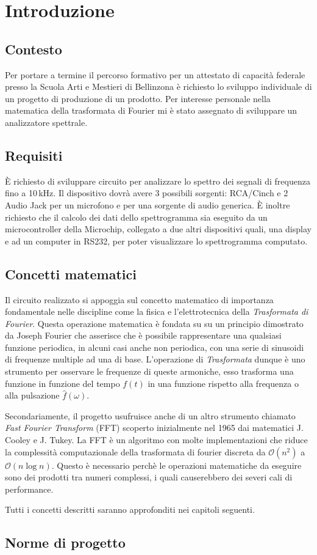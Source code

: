 \chapter{Introduzione}

\section{Contesto}
Per portare a termine il percorso formativo per un attestato di capacit\`a
federale presso la Scuola Arti e Mestieri di Bellinzona \`e richiesto lo
sviluppo individuale di un progetto di produzione di un prodotto.
Per interesse personale nella matematica della trasformata di Fourier mi \`e
stato assegnato di sviluppare un analizzatore spettrale.

\section{Requisiti}
\`E richiesto di sviluppare circuito per analizzare lo spettro dei segnali di
frequenza fino a 10\,kHz. Il dispositivo dovr\`a avere 3 possibili sorgenti:
RCA/Cinch e 2 Audio Jack per un microfono e per una sorgente di audio
generica. \`E inoltre richiesto che il calcolo dei dati dello spettrogramma
sia eseguito da un microcontroller della Microchip, collegato a due
altri dispositivi quali, una display e ad un computer in RS232, per poter
visualizzare lo spettrogramma computato.

\section{Concetti matematici}
Il circuito realizzato si appoggia sul concetto matematico di importanza
fondamentale nelle discipline come la fisica e l'elettrotecnica della
\emph{Trasformata di Fourier}. Questa operazione matematica \`e fondata su su
un principio dimostrato da Joseph Fourier che asserisce che \`e possibile
rappresentare una qualsiasi funzione periodica, in alcuni casi anche non
periodica, con una serie di sinusoidi di frequenze multiple ad una di base.
L'operazione di \emph{Trasformata} dunque \`e uno strumento per osservare
le frequenze di queste armoniche, esso trasforma una funzione in funzione del
tempo \(f(t)\) in una funzione rispetto alla frequenza o alla pulsazione
\(\hat f(\omega)\).

Secondariamente, il progetto usufruisce anche di un altro strumento chiamato
\emph{Fast Fourier Transform} (FFT) scoperto inizialmente nel 1965 dai
matematici J. Cooley e J. Tukey. La FFT \`e un algoritmo con molte
implementazioni che riduce la complessit\`a computazionale della trasformata
di fourier discreta da \(\mathcal{O}(n^2)\) a \(\mathcal{O}(n \log n)\).
Questo \`e necessario perch\`e le operazioni matematiche da eseguire sono dei
prodotti tra numeri complessi, i quali causerebbero dei severi cali di
performance.

Tutti i concetti descritti saranno approfonditi nei capitoli seguenti.

\section{Norme di progetto}

